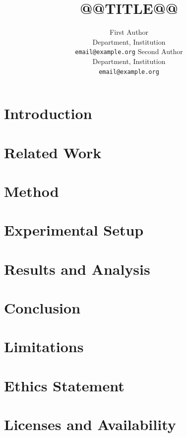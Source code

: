 \documentclass{article}
\title{@@TITLE@@}
\author{First Author \\ Department, Institution \\ \texttt{email@example.org}
  \And Second Author \\ Department, Institution \\ \texttt{email@example.org}}
\begin{document}
\maketitle

\begin{abstract}

\end{abstract}

\section{Introduction}\label{sec:intro}


\section{Related Work}\label{sec:related}


\section{Method}\label{sec:method}


\section{Experimental Setup}\label{sec:setup}


\section{Results and Analysis}\label{sec:results}


\section{Conclusion}\label{sec:conclusion}


\section*{Limitations}


\section*{Ethics Statement}


\section*{Licenses and Availability}

\end{document}
